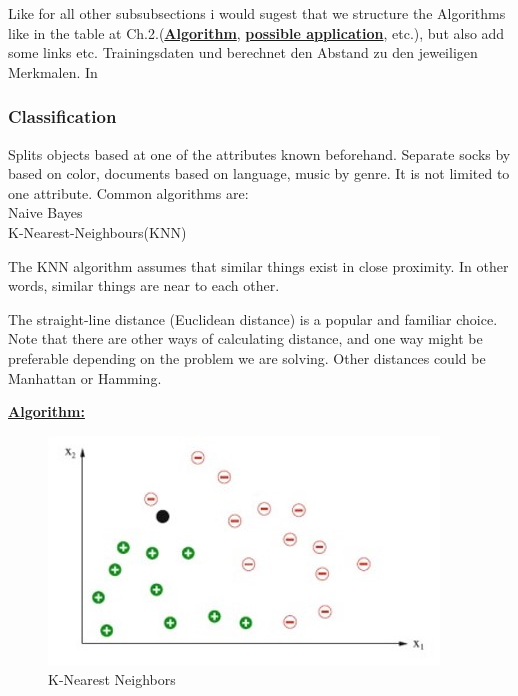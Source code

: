Like for all other subsubsections i would sugest that we structure the Algorithms like in the table at Ch.2.(\textbf{\underline{Algorithm}}, \textbf{\underline{possible application}}, etc.), but also add some links etc. Trainingsdaten und berechnet den Abstand zu den jeweiligen Merkmalen. In 
 

\subsubsection{Classification}
Splits objects based at one of the attributes known beforehand. Separate socks by based on color, documents based on language, music by genre. It is not limited to one attribute.
Common algorithms are:\\
Naive Bayes\\


K-Nearest-Neighbours(KNN)

The KNN algorithm assumes that similar things exist in close proximity. In other words, similar things are near to each other.

The straight-line distance (Euclidean distance) is a popular and familiar choice.
Note that there are other ways of calculating distance, and one way might be preferable depending on the problem we are solving. Other distances could be Manhattan or Hamming.

\textbf{\underline{Algorithm:}}\\
\begin{figure}[hbtp]
	\centering
	\includegraphics[scale=1]{knn1}
	\caption{K-Nearest Neighbors}
	\label{fig:Datensatz - unbearbeitet}
\end{figure}

